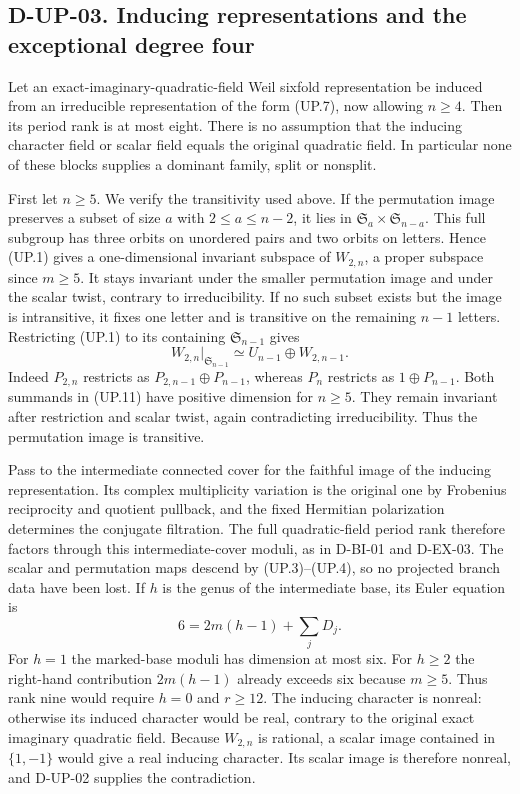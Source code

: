 \subsection*{D-UP-03. Inducing representations and the exceptional degree four}

Let an exact-imaginary-quadratic-field Weil sixfold representation
be induced from an irreducible representation of the form (UP.7),
now allowing $n\ge4$.  Then its period rank is at most eight.
There is no assumption that the inducing character field or scalar
field equals the original quadratic field.  In particular none of
these blocks supplies a dominant family, split or nonsplit.

First let $n\ge5$.  We verify the transitivity used above.
If the permutation image preserves a subset of size $a$ with
$2\le a\le n-2$, it lies in
$\mathfrak S_a\times\mathfrak S_{n-a}$.
This full subgroup has three orbits on unordered pairs and two
orbits on letters.  Hence (UP.1) gives a one-dimensional invariant
subspace of $W_{2,n}$, a proper subspace since $m\ge5$.
It stays invariant under the smaller permutation image and under
the scalar twist, contrary to irreducibility.
If no such subset exists but the image is intransitive, it fixes
one letter and is transitive on the remaining $n-1$ letters.
Restricting (UP.1) to its containing $\mathfrak S_{n-1}$ gives
\[
 W_{2,n}|_{\mathfrak S_{n-1}}
       \simeq U_{n-1}\oplus W_{2,n-1}.                  \tag{UP.11}
\]
Indeed $P_{2,n}$ restricts as $P_{2,n-1}\oplus P_{n-1}$,
whereas $P_n$ restricts as $1\oplus P_{n-1}$.
Both summands in (UP.11) have positive dimension for $n\ge5$.
They remain invariant after restriction and scalar twist, again
contradicting irreducibility.  Thus the permutation image is
transitive.

Pass to the intermediate connected cover for the faithful image
of the inducing representation.  Its complex multiplicity
variation is the original one by Frobenius reciprocity and
quotient pullback, and the fixed Hermitian polarization determines
the conjugate filtration.  The full quadratic-field period rank
therefore factors through this intermediate-cover moduli, as in
D-BI-01 and D-EX-03.  The scalar and permutation maps descend by
(UP.3)--(UP.4), so no projected branch data have been lost.
If $h$ is the genus of the intermediate base, its Euler equation is
\[
                       6=2m(h-1)+\sum_jD_j.
\]
For $h=1$ the marked-base moduli has dimension at most six.
For $h\ge2$ the right-hand contribution $2m(h-1)$ already
exceeds six because $m\ge5$.
Thus rank nine would require $h=0$ and $r\ge12$.
The inducing character is nonreal: otherwise its induced character
would be real, contrary to the original exact imaginary quadratic
field.  Because $W_{2,n}$ is rational, a scalar image contained in
$\{1,-1\}$ would give a real inducing character.  Its scalar image
is therefore nonreal, and D-UP-02 supplies the contradiction.

